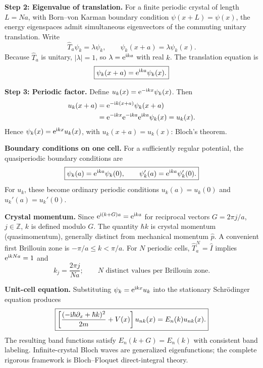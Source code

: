 \documentclass[11pt,a4paper]{article}
\begin{document}
\textbf{Step 2: Eigenvalue of translation.} For a finite periodic crystal of length \(L=Na\), with Born--von Karman boundary condition \(\psi(x+L)=\psi(x)\), the energy eigenspaces admit simultaneous eigenvectors of the commuting unitary translation. Write
\begin{equation}\hat T_a\psi_k=\lambda\psi_k,\qquad\psi_k(x+a)=\lambda\psi_k(x).\end{equation}
Because \(\hat T_a\) is unitary, \(|\lambda|=1\), so \(\lambda=\mathrm{e}^{\mathrm{i} ka}\) with real \(k\). The translation equation is
\begin{equation}\boxed{\psi_k(x+a)=\mathrm{e}^{\mathrm{i} ka}\psi_k(x).}\end{equation}

\textbf{Step 3: Periodic factor.} Define \(u_k(x)=\mathrm{e}^{-\mathrm{i} kx}\psi_k(x)\). Then
\begin{align}
u_k(x+a)&=\mathrm{e}^{-\mathrm{i} k(x+a)}\psi_k(x+a)\\
&=\mathrm{e}^{-\mathrm{i} kx}\mathrm{e}^{-\mathrm{i} ka}\mathrm{e}^{\mathrm{i} ka}\psi_k(x)=u_k(x).
\end{align}
Hence \(\psi_k(x)=\mathrm{e}^{\mathrm{i} kx}u_k(x)\), with \(u_k(x+a)=u_k(x)\): Bloch's theorem.

\textbf{Boundary conditions on one cell.} For a sufficiently regular potential, the quasiperiodic boundary conditions are
\begin{equation}\boxed{\psi_k(a)=\mathrm{e}^{\mathrm{i} ka}\psi_k(0),\qquad \psi_k'(a)=\mathrm{e}^{\mathrm{i} ka}\psi_k'(0).}\end{equation}
For \(u_k\), these become ordinary periodic conditions \(u_k(a)=u_k(0)\) and \(u_k'(a)=u_k'(0)\).

\textbf{Crystal momentum.} Since \(\mathrm{e}^{\mathrm{i}(k+G)a}=\mathrm{e}^{\mathrm{i} ka}\) for reciprocal vectors \(G=2\pi j/a\), \(j\in\mathbb Z\), \(k\) is defined modulo \(G\). The quantity \(\hbar k\) is crystal momentum (quasimomentum), generally distinct from mechanical momentum \(\hat p\). A convenient first Brillouin zone is \(-\pi/a\le k<\pi/a\). For \(N\) periodic cells, \(\hat T_a^N=\hat I\) implies \(\mathrm{e}^{\mathrm{i} kNa}=1\) and
\begin{equation}\boxed{k_j=\frac{2\pi j}{Na};\qquad N\text{ distinct values per Brillouin zone}.}\end{equation}

\textbf{Unit-cell equation.} Substituting \(\psi_k=\mathrm{e}^{\mathrm{i} kx}u_k\) into the stationary Schr\"odinger equation produces
\begin{equation}\boxed{\left[\frac{(-\mathrm{i}\hbar\partial_x+\hbar k)^2}{2m}+V(x)\right]u_{nk}(x)=E_n(k)u_{nk}(x).}\end{equation}
The resulting band functions satisfy \(E_n(k+G)=E_n(k)\) with consistent band labeling. Infinite-crystal Bloch waves are generalized eigenfunctions; the complete rigorous framework is Bloch--Floquet direct-integral theory.
\end{document}
